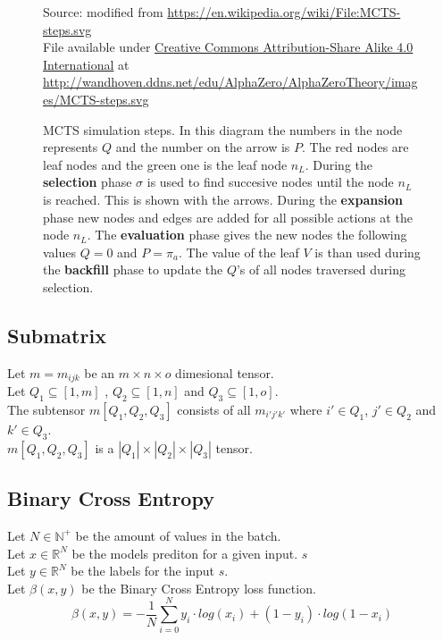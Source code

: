 \documentclass[12pt]{article}
\newcommand{\source}[1]{\caption*{Source: {#1}} }
\begin{document}
\begin{figure}
    \centering
	\captionsetup{width=.9\linewidth}
    
		\caption[width=0.7\columnwidth]{MCTS simulation steps. In this diagram the numbers in the node represents \(Q\) and the number on the arrow is \(P\). The red nodes are leaf nodes and the green one is the leaf node \(n_L\). During the \textbf{selection} phase \(\sigma\) is used to find succesive nodes until the node \(n_L\) is reached. This is shown with the arrows. During the \textbf{expansion} phase new nodes and edges are added for all possible actions at the node \(n_L\). The \textbf{evaluation} phase gives the new nodes the following values \(Q = 0\) and \(P = \pi_a\). The value of the leaf \(V\) is than used during the \textbf{backfill} phase to update the \(Q\)'s of all nodes traversed during selection.}
		\source{modified from \url{https://en.wikipedia.org/wiki/File:MCTS-steps.svg}\\File available under \href{https://creativecommons.org/licenses/by-sa/4.0/deed.en}{Creative Commons Attribution-Share Alike 4.0 International} at \url{http://wandhoven.ddns.net/edu/AlphaZero/AlphaZeroTheory/images/MCTS-steps.svg}}
	\label{MCTS-simulation}
\end{figure}

\subsection{Submatrix}
\label{sec:Ref:submatrix}
Let \(m = m_{ijk}\) be an \(m\times n\times o\) dimesional tensor.\\
Let \(Q_1 \subseteq [1,m ]\) , \(Q_2 \subseteq [1, n]\) and \(Q_3 \subseteq [1,o]\).\\
The subtensor \(m[Q_1, Q_2, Q_3]\) consists of all  \(m_{i'j'k'}\) where \( i' \in Q_1\), \( j' \in Q_2\) and \( k' \in Q_3\).\\
\(m[Q_1, Q_2, Q_3]\) is a \(|Q_1| \times |Q_2| \times |Q_3|\) tensor.\\

\subsection{Binary Cross Entropy}
Let \(N \in \mathbb{N}^+\) be the amount of values in the batch.\\
Let \(x  \in \mathbb{R}^N\) be the models prediton for a given input.  \(s\)\\
Let \(y  \in \mathbb{R}^N\) be the labels for the input \(s\).\\
Let \(\beta(x, y)\) be the Binary Cross Entropy loss function.
\[
\beta(x, y) = -\frac{1}{N}\sum_{i=0}^{N}y_i\cdot log(x_i) + (1 - y_i) \cdot log(1 - x_i)
\]
\end{document}

